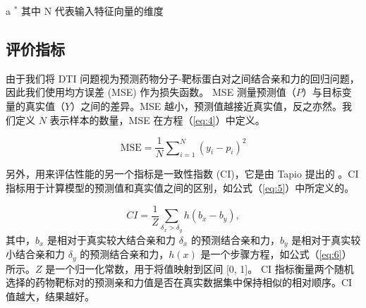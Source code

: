 \begin{table}[!htbp]
\centering
{}
\begin{tablenotes}
\item [a] $^*$ 其中 N 代表输入特征向量的维度\\
\end{tablenotes}
\label{table:embeddti_setting}
\end{table}

\subsection{评价指标}
由于我们将 DTI 问题视为预测药物分子-靶标蛋白对之间结合亲和力的回归问题，因此我们使用均方误差 (MSE) 作为损失函数。 MSE 测量预测值（$P$）与目标变量的真实值（$Y$）之间的差异。MSE 越小，预测值越接近真实值，反之亦然。我们定义 $N$ 表示样本的数量，MSE 在方程（\ref{eq:4}）中定义。

\begin{equation}
  \text{MSE} = \frac{1}{N}\sum\nolimits_{i=1}^{N}(y_i - p_i)^{2}
\label{eq:4}
\end{equation}

另外，用来评估性能的另一个指标是一致性指数 (CI)，它是由 Tapio 提出的 \cite{pahikkala2015toward}。CI 指标用于计算模型的预测值和真实值之间的区别，如公式（\ref{eq:5}）中所定义的。

\begin{equation}
  CI = \frac{1}{Z}\sum\limits_{\delta_x > \delta_y}h(b_x - b_y),
\label{eq:5}
\end{equation}
其中，$b_x$ 是相对于真实较大结合亲和力 $\delta_x$ 的预测结合亲和力，$b_y$ 是相对于真实较小结合亲和力 $\delta_y$ 的预测结合亲和力，$h(x)$ 是一个步骤方程，如公式（\ref{eq:6}）所示。$Z$ 是一个归一化常数，用于将值映射到区间 [0, 1]。 CI 指标衡量两个随机选择的药物靶标对的预测亲和力值是否在真实数据集中保持相似的相对顺序。CI 值越大，结果越好。

